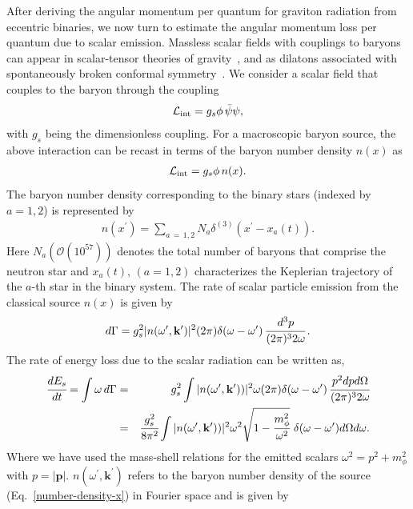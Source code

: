 \documentclass[aps,prd]{revtex4-2}
\begin{document}
After deriving the angular momentum per quantum for graviton radiation from eccentric binaries, we now turn to estimate the angular momentum loss per quantum due to scalar emission. Massless scalar fields with couplings to baryons can appear in scalar-tensor theories of gravity~\cite{Brans:1961sx, Dicke:1961gz, Weinberg:1972kfs}, and as dilatons associated with spontaneously broken conformal symmetry~\cite{Fujii:1971vv}. We consider a scalar field that couples to the baryon through the coupling 
\begin{eqnarray}\label{scalar-psi}
\mathcal{L}_{\rm{int}} = g_{s} \phi\, \bar{\psi} \psi,
\end{eqnarray}
with $g_s$ being the dimensionless coupling. For a macroscopic baryon source, the above interaction can be recast in terms of the baryon number density $n(x)$ as 
\begin{eqnarray}\label{scalar-n}
    \mathcal{L}_{\rm{int}} = g_{s} \phi\, n(x).
\end{eqnarray}
The baryon number density corresponding to the binary stars (indexed by $a = 1,2$) is represented by
\begin{eqnarray}\label{number-density-x}
    n(x^\prime) = \sum _{a\, =\, 1, 2}  N_{a}  \delta^{(3)} (x^\prime - x_{a}(t)).
\end{eqnarray}
Here $N_{a}(\mathcal{O}(10^{57}))$ denotes the total number of baryons that comprise the neutron star and $x_{a}(t),\,(a=1,2)$ characterizes the Keplerian trajectory of the $a$-th star in the binary system. The rate of scalar particle emission from the classical source $n (x)$ is given by
\begin{eqnarray}\label{emission-rate}
    d\Gamma = g_{s}^{2} |n(\omega^{\prime},\mathbf{k}^\prime)|^{2}(2\pi) \delta(\omega - \omega^{\prime})\,\cfrac{d^{3}p}{(2\pi)^{3}2\omega}\,.
\end{eqnarray}
The rate of energy loss due to the scalar radiation can be written as,
\begin{eqnarray}\label{eq:rate-of-energy-loss-scalar}
    \cfrac{dE_{s}}{dt} = \int \omega\, d\Gamma &=&  g_{s}^{2}\int  |n(\omega^{\prime},\mathbf{k}^\prime))|^{2} \omega (2\pi) \delta(\omega - \omega^{\prime})\,\cfrac{p^{2} dp d\Omega}{(2\pi)^{3} 2\omega} \nonumber \\
     &=& \cfrac{g_{s}^{2}}{8\pi^{2}}\int  |n(\omega^{\prime},\mathbf{k}^\prime))|^{2} \omega^{2} \sqrt{1 - \cfrac{m_{\phi}^{2}}{\omega^{2}}}\,  
 \, \delta(\omega - \omega^{\prime})  d\Omega d\omega.
\end{eqnarray}
Where we have used the mass-shell relations for the emitted scalars $\omega^2=p^2+m_\phi^2$ with $p=|\mathbf{p}|$. $n(\omega^\prime,\mathbf{k}^\prime)$ refers to the baryon number density of the source (Eq.~\eqref{number-density-x}) in Fourier space and is given by
\end{document}
